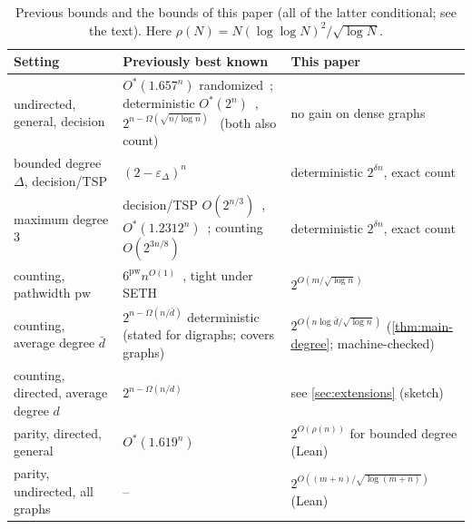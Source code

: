 \documentclass[11pt]{amsart}
\theoremstyle{plain}
\theoremstyle{definition}
\theoremstyle{remark}
\numberwithin{equation}{section}
\begin{document}
\begin{table}[ht]
\centering
\small
\caption{Previous bounds and the bounds of this paper (all of the latter conditional; see the
text). Here $\rho(N)=N(\log\log N)^2/\sqrt{\log N}$.}\label{tab:sota}
\begin{tabular}{@{}>{\raggedright\arraybackslash}p{4.2cm}>{\raggedright\arraybackslash}p{5.6cm}>{\raggedright\arraybackslash}p{5.0cm}@{}}
\toprule
Setting & Previously best known & This paper \\
\midrule
undirected, general, decision & $O^{*}(1.657^n)$ randomized~\cite{Bjorklund14}; deterministic $O^{*}(2^n)$~\cite{Bellman62,HeldKarp62,KGK77,Karp82,Bax93}, $2^{n-\Omega(\sqrt{n/\log n})}$~\cite{Bjorklund16} (both also count) & no gain on dense graphs \\
bounded degree $\Delta$, decision/TSP & $(2-\varepsilon_\Delta)^n$~\cite{BHKK12} & deterministic $2^{\delta n}$, exact count \\
maximum degree $3$ & decision/TSP $O(2^{n/3})$~\cite{Eppstein07}, $O^{*}(1.2312^n)$~\cite{XiaoNagamochi16}; counting $O(2^{3n/8})$~\cite{Eppstein07} & deterministic $2^{\delta n}$, exact count \\
counting, pathwidth $\mathrm{pw}$ & $6^{\mathrm{pw}}n^{O(1)}$~\cite[Table~1]{BCKN15}, tight under SETH~\cite[Thm.~1.1]{CLN18} & $2^{O(m/\sqrt{\log n})}$ \\
counting, average degree $\bar d$ & $2^{n-\Omega(n/\bar d)}$ deterministic~\cite{BjorklundWilliams19} (stated for digraphs; covers graphs) & $2^{O(n\log\bar d/\sqrt{\log n})}$ (\cref{thm:main-degree}; machine-checked) \\
counting, directed, average degree $d$ & $2^{n-\Omega(n/d)}$~\cite{BjorklundWilliams19} & see \cref{sec:extensions} (sketch) \\
parity, directed, general & $O^{*}(1.619^n)$~\cite{BjorklundHusfeldt13} & $2^{O(\rho(n))}$ for bounded degree (Lean) \\
parity, undirected, all graphs & -- & $2^{O((m+n)/\sqrt{\log(m+n)})}$ (Lean) \\
\bottomrule
\end{tabular}
\end{table}
\end{document}
